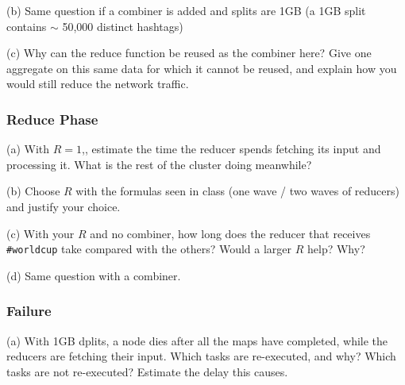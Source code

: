 \documentclass[11pt,a4paper]{article}
\begin{document}
\begin{tcolorbox}[colback=gray!20,colframe=gray!20, sharp corners]
(b) Same question if a combiner is added and splits are 1GB (a 1GB split contains $\sim$ 50,000 distinct hashtags)
\end{tcolorbox}


\begin{tcolorbox}[colback=gray!20,colframe=gray!20, sharp corners]
(c) Why can the reduce function be reused as the combiner here? Give one aggregate on this same data for which it cannot be reused, and explain how you would still reduce the network traffic.
\end{tcolorbox}

\subsubsection*{Reduce Phase}

\begin{tcolorbox}[colback=gray!20,colframe=gray!20, sharp corners]
(a) With $R=1$,, estimate the time the reducer spends fetching its input and processing it. What is the rest of the cluster doing meanwhile?
\end{tcolorbox}

\begin{tcolorbox}[colback=gray!20,colframe=gray!20, sharp corners]
(b) Choose $R$ with the formulas seen in class (one wave / two waves of reducers) and justify your choice.
\end{tcolorbox}

\begin{tcolorbox}[colback=gray!20,colframe=gray!20, sharp corners]
(c) With your $R$ and no combiner, how long does the reducer that receives \texttt{\#worldcup} take compared with the others? Would a larger $R$ help? Why? 
\end{tcolorbox}

\begin{tcolorbox}[colback=gray!20,colframe=gray!20, sharp corners]
(d) Same question with a combiner.
\end{tcolorbox}

\subsubsection*{Failure}
    \begin{tcolorbox}[colback=gray!20,colframe=gray!20, sharp corners]
        (a) With 1GB dplits, a node dies after all the maps have completed, while the reducers are fetching their input. Which tasks are re-executed, and why? Which tasks are not re-executed? Estimate the delay this causes.
    \end{tcolorbox}
\end{document}
